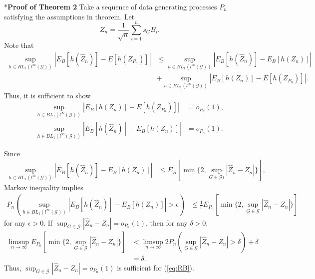 \documentclass[12pt,oneside,reqno,english]{amsart}
\makeatletter
\renewcommand\subsection{\@startsection{subsection}{2}%
  \z@{-.5\linespacing\@plus-.7\linespacing}{.5\linespacing}%
  {\normalfont\scshape}}
\theoremstyle{definition}
\makeatother
\begin{document}
\subsection*{\bf{Proof of Theorem 2}}
Take a sequence of data generating processes $P_{n}$ satisfying the assumptions in theorem. 
Let 
\[Z_{n}=\frac{1}{\sqrt{n}}\sum_{i=1}^{n}s_{G}B_{i}.\]
Note that 
\begin{align*}
\sup_{h\in BL_{1}(l^{\infty}(\mathcal{G}))}|E_{B}[h(\hat{Z}_{n})]-E[h(Z_{P_{n}})]|
&\leq \sup_{h\in BL_{1}(l^{\infty}(\mathcal{G}))}|E_{B}[h(\hat{Z}_{n})]-E_{B}[h(Z_{n})]|\\
&+\sup_{h\in BL_{1}(l^{\infty}(\mathcal{G}))}|E_{B}[h(Z_{n})]-E[h(Z_{P_{n}})]|.
\end{align*}
Thus, it is sufficient to show 
\begin{align}
\sup_{h\in BL_{1}(l^{\infty}(\mathcal{G}))}|E_{B}[h(Z_{n})]-E[h(Z_{P_{n}})]|&=o_{P_{n}}(1),\label{eq:asylinB}\\
\sup_{h\in BL_{1}(l^{\infty}(\mathcal{G}))}|E_{B}[h(\hat{Z}_{n})]-E_{B}[h(Z_{n})]|&=o_{P_{n}}(1).\label{eq:RB}
\end{align}

Since 
\begin{align*}
\sup_{h\in BL_{1}(l^{\infty}(\mathcal{G}))}|E_{B}[h(\hat{Z}_{n})]-E_{B}[h(Z_{n})]|
&\leq E_{B}[\min\{2, \sup_{G\in \mathcal{G})}|\hat{Z}_{n}-Z_{n}|\}],
\end{align*}
Markov inequality implies 
\begin{align*}
P_{n}(\sup_{h\in BL_{1}(l^{\infty}(\mathcal{G}))}|E_{B}[h(\hat{Z}_{n})]-E_{B}[h(Z_{n})]|>\epsilon)
&\leq \frac{1}{\epsilon}E_{P_{n}}[\min\{2, \sup_{G\in \mathcal{G}}|\hat{Z}_{n}-Z_{n}|\}]
\end{align*}
for any $\epsilon>0$. If $\sup_{G\in \mathcal{G}}|\hat{Z}_{n}-Z_{n}|=o_{P_{n}}(1)$, then for any $\delta>0$, 
\begin{align*}
\limsup_{n\rightarrow\infty} E_{P_{n}}[\min\{2, \sup_{G\in \mathcal{G}}|\hat{Z}_{n}-Z_{n}|\}]&<\limsup_{n\rightarrow\infty}2P_{n}(\sup_{G\in \mathcal{G}}|\hat{Z}_{n}-Z_{n}|>\delta)+\delta\\
&=\delta.
\end{align*}
Thus, $\sup_{G\in \mathcal{G}}|\hat{Z}_{n}-Z_{n}|=o_{P_{n}}(1)$ is sufficient for (\ref{eq:RB}).
\end{document}
